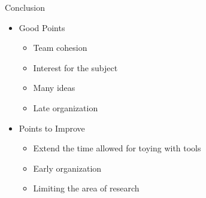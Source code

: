 \documentclass{beamer}
\newcounter{m} %
\newcounter{c} %
\begin{document}
\begin{frame}{Conclusion}
\begin{itemize}
\item Good Points
\begin{itemize}
\item Team cohesion 
\item Interest for the subject
\item Many ideas
\item Late organization
\end{itemize}

\item Points to Improve 
\begin{itemize}
\item Extend the time allowed for toying with tools
\item Early organization 
\item Limiting the area of research
\end{itemize}
\end{itemize}


\end{frame}
\end{document}
